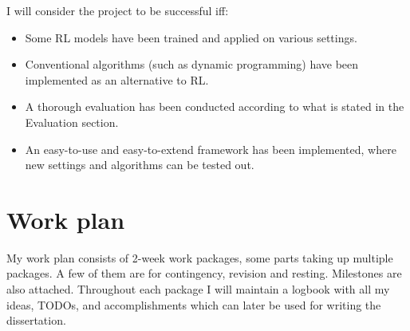 I will consider the project to be successful iff:

\begin{itemize}
    \item
    Some RL models have been trained and applied on various settings.
    \item
    Conventional algorithms (such as dynamic programming) have been implemented as an alternative to RL.
    \item
    A thorough evaluation has been conducted according to what is stated in the Evaluation section.
    \item
    An easy-to-use and easy-to-extend framework has been implemented, where new settings and algorithms can be tested out.
\end{itemize}


\section*{Work plan}

My work plan consists of 2-week work packages, some parts taking up multiple packages. A few of them are for contingency, revision and resting. Milestones are also attached. Throughout each package I will maintain a logbook with all my ideas, TODOs, and accomplishments which can later be used for writing the dissertation.



